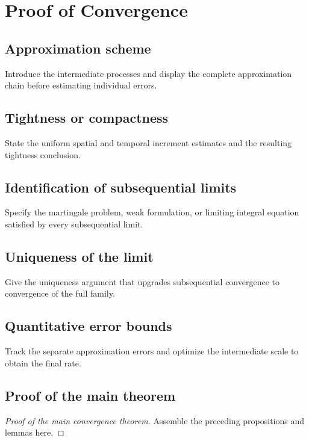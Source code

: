 \section{Proof of Convergence}

\subsection{Approximation scheme}

\begin{draftnote}
Introduce the intermediate processes and display the complete approximation
chain before estimating individual errors.
\end{draftnote}

\subsection{Tightness or compactness}

\begin{proposition}[Tightness]
State the uniform spatial and temporal increment estimates and the resulting
tightness conclusion.
\end{proposition}

\subsection{Identification of subsequential limits}

\begin{lemma}[Identification]
Specify the martingale problem, weak formulation, or limiting integral
equation satisfied by every subsequential limit.
\end{lemma}

\subsection{Uniqueness of the limit}

\begin{draftnote}
Give the uniqueness argument that upgrades subsequential convergence to
convergence of the full family.
\end{draftnote}

\subsection{Quantitative error bounds}

\begin{draftnote}
Track the separate approximation errors and optimize the intermediate scale
to obtain the final rate.
\end{draftnote}

\subsection{Proof of the main theorem}

\begin{proof}[Proof of the main convergence theorem]
Assemble the preceding propositions and lemmas here.
\end{proof}
